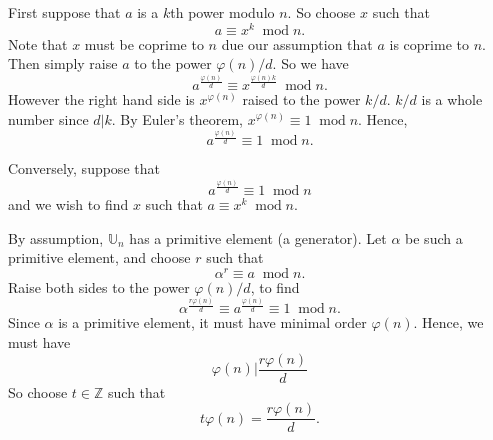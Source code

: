 \documentclass[10pt]{article}
\newenvironment{proof}[1][Proof]{\begin{trivlist}
\item[\hskip \labelsep {\bfseries #1}]}{\end{trivlist}}
\newcommand{\modulo}[1]{\;\operatorname{mod} #1}
\begin{document}
    \begin{proof}
        
        First suppose that $a$ is a $k$th power modulo $n$. So choose $x$
        such that
        \begin{equation*}
            a \equiv x^k\modulo{n}.
        \end{equation*}
        Note that $x$ must be coprime to $n$ due our assumption
        that $a$ is coprime to $n$.
        Then simply raise $a$ to the power $\varphi(n)/d$. So we have
        \begin{equation*}
            a^{\frac{\varphi(n)}{d}}\equiv x^{\frac{\varphi(n)k}{d}} \modulo{n}.
        \end{equation*}
        However the right hand side is $x^{\varphi(n)}$ raised to the power
        $k/d$. $k/d$ is a whole number since $d|k$. By Euler's theorem,
        $x^{\varphi(n)}\equiv 1 \modulo{n}$. Hence,
        \begin{equation*}
            a^{\frac{\varphi(n)}{d}} \equiv 1\modulo{n}.
        \end{equation*} 
        
        
        
        Conversely, suppose that
        \begin{equation*}
            a^{\frac{\varphi(n)}{d}}\equiv 1\modulo{n}
        \end{equation*}
        and we wish to find $x$ such that $a\equiv x^k\modulo{n}$. 
        
        By assumption, $\mathbb{U}_n$ has a primitive element (a generator). Let
        $\alpha$ be such a primitive element, and choose $r$ such that
        \begin{equation*}
            \alpha^r\equiv a\modulo{n}.
        \end{equation*}
        Raise both sides to the power $\varphi(n)/d$, to find
        \begin{equation*}
            \alpha^{\frac{r\varphi(n)}{d}}\equiv a^\frac{\varphi(n)}{d}\equiv 1\modulo{n}.
        \end{equation*}
        Since $\alpha$ is a primitive element, it must have minimal order $\varphi(n)$. Hence,
        we must have
        \begin{equation*}
            \varphi(n)|\frac{r\varphi(n)}{d}
        \end{equation*} 
        So choose $t\in\mathbb{Z}$ such that
        \begin{equation*}
            t\varphi(n) = \frac{r\varphi(n)}{d}.
        \end{equation*}
        

\end{proof}
\end{document}
